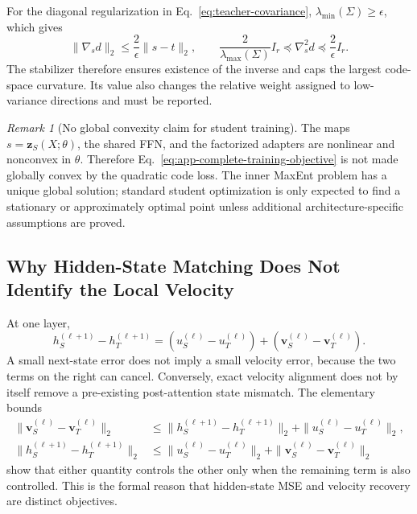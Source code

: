 \documentclass{article}
\newcommand{\bz}{\boldsymbol{z}}
\newcommand{\bv}{\boldsymbol{v}}
\newcommand{\bSigma}{\varSigma}
\newcommand{\bI}{I}
\theoremstyle{plain}
\theoremstyle{definition}
\theoremstyle{remark}
\newtheorem{remark}{Remark}
\begin{document}
For the diagonal regularization in Eq.~\eqref{eq:teacher-covariance},
$\lambda_{\min}(\bSigma)\ge\epsilon$, which gives
\begin{equation}
  \|\nabla_s d\|_2\le\frac{2}{\epsilon}\|s-t\|_2,
  \qquad
  \frac{2}{\lambda_{\max}(\bSigma)}\bI_r
  \preceq\nabla_s^2d\preceq\frac{2}{\epsilon}\bI_r.
  \label{eq:app-epsilon-conditioning}
\end{equation}
The stabilizer therefore ensures existence of the inverse and caps the largest
code-space curvature.  Its value also changes the relative weight assigned to
low-variance directions and must be reported.

\begin{remark}[No global convexity claim for student training]
\label{rem:app-outer-nonconvex}
The maps $s=\bz_S(X;\theta)$, the shared FFN, and the factorized adapters are
nonlinear and nonconvex in $\theta$.  Therefore
Eq.~\eqref{eq:app-complete-training-objective} is not made globally convex by the
quadratic code loss.  The inner MaxEnt problem has a unique global solution;
standard student optimization is only expected to find a stationary or
approximately optimal point unless additional architecture-specific assumptions
are proved.
\end{remark}

\subsection{Why Hidden-State Matching Does Not Identify the Local Velocity}
\label{app:hidden-velocity-nonidentifiability}

At one layer,
\begin{equation}
  h_S^{(\ell+1)}-h_T^{(\ell+1)}
  =\left(u_S^{(\ell)}-u_T^{(\ell)}\right)
  +\left(\bv_S^{(\ell)}-\bv_T^{(\ell)}\right).
  \label{eq:app-state-velocity-decomposition}
\end{equation}
A small next-state error does not imply a small velocity error, because the two
terms on the right can cancel.  Conversely, exact velocity alignment does not by
itself remove a pre-existing post-attention state mismatch.  The elementary bounds
\begin{equation}
\begin{aligned}
  \|\bv_S^{(\ell)}-\bv_T^{(\ell)}\|_2
  &\le\|h_S^{(\ell+1)}-h_T^{(\ell+1)}\|_2
  +\|u_S^{(\ell)}-u_T^{(\ell)}\|_2,\\
  \|h_S^{(\ell+1)}-h_T^{(\ell+1)}\|_2
  &\le\|u_S^{(\ell)}-u_T^{(\ell)}\|_2
  +\|\bv_S^{(\ell)}-\bv_T^{(\ell)}\|_2
  \label{eq:app-state-velocity-triangle}
\end{aligned}
\end{equation}
show that either quantity controls the other only when the remaining term is also
controlled.  This is the formal reason that hidden-state MSE and velocity recovery
are distinct objectives.
\end{document}
